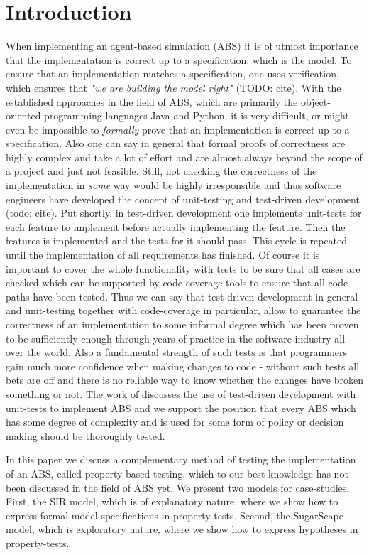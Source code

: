 \section{Introduction}
When implementing an agent-based simulation (ABS) it is of utmost importance that the implementation is correct up to a specification, which is the model. To ensure that an implementation matches a specification, one uses verification, which ensures that \textit{"we are building the model right"} (TODO: cite). With the established approaches in the field of ABS, which are primarily the object-oriented programming languages Java and Python, it is very difficult, or might even be impossible to \textit{formally} prove that an implementation is correct up to a specification. Also one can say in general that formal proofs of correctness are highly complex and take a lot of effort and are almost always beyond the scope of a project and just not feasible. Still, not checking the correctness of the implementation in \textit{some} way would be highly irresponsible and thus software engineers have developed the concept of unit-testing and test-driven development (todo: cite). Put shortly, in test-driven development one implements unit-tests for each feature to implement before actually implementing the feature. Then the features is implemented and the tests for it should pass. This cycle is repeated until the implementation of all requirements has finished. Of course it is important to cover the whole functionality with tests to be sure that all cases are checked which can be supported by code coverage tools to ensure that all code-paths have been tested.
Thus we can say that test-driven development in general and unit-testing together with code-coverage in particular, allow to guarantee the correctness of an implementation to some informal degree which has been proven to be sufficiently enough through years of practice in the software industry all over the world. Also a fundamental strength of such tests is that programmers gain much more confidence when making changes to code - without such tests all bets are off and there is no reliable way to know whether the changes have broken something or not.
The work of \cite{collier_test-driven_2013} discusses the use of test-driven development with unit-tests to implement ABS and we support the position that every ABS which has some degree of complexity and is used for some form of policy or decision making should be thoroughly tested.

In this paper we discuss a complementary method of testing the implementation of an ABS, called property-based testing, which to our best knowledge has not been discussed in the field of ABS yet. We present two models for case-studies. First, the SIR model, which is of explanatory nature, where we show how to express formal model-specifications in property-tests. Second, the SugarScape model, which is exploratory nature, where we  show how to express hypotheses in property-tests.

